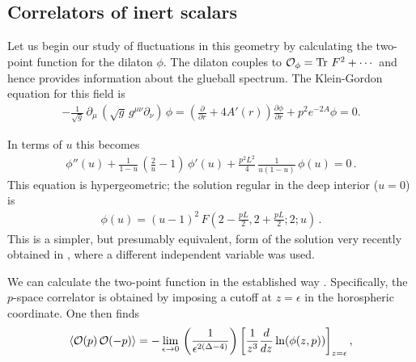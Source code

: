\documentclass[a4paper,12pt]{article}
\def\Tr{\rm Tr\ }
\begin{document}
\subsection{Correlators of inert scalars}

Let us begin our study of fluctuations in this geometry by calculating the
two-point function for the dilaton $\phi$.  The dilaton couples to
${\cal O}_\phi ={\Tr} F^2 + \cdots$ and hence provides information 
about the glueball
spectrum.  The Klein-Gordon equation for this field is 
\begin{eqnarray}
- \frac{1}{\sqrt{g}} \, \partial_{\mu} \, (\sqrt{g} \, g^{\mu \nu}
 \partial_{\nu} ) \, \phi = \left(\frac{\partial}{\partial r} +4A'(r)
 \right) \frac{ \partial \phi}{\partial r} +p^2 e^{-2A} \phi =0.
\end{eqnarray}

In terms of $u$ this becomes
\begin{eqnarray}
\phi''(u) + \frac{1}{1-u} \, \left( \frac{2}{u} -1 \right) \, \phi'(u)
+ \frac{p^2 L^2}{4} \, \frac{1}{u (1-u)} \, \phi(u) = 0 \,.
\end{eqnarray}
This equation is hypergeometric; the solution regular in the
deep interior ($u = 0$) is
\begin{eqnarray}
\phi(u) = (u-1)^2 \, F \left( 2- \frac{pL}{2},2+ \frac{pL}{2};2;u \right) \,.
\end{eqnarray}
This is a simpler, but presumably equivalent, form of the solution very 
recently
obtained in \cite{agpz}, where a different independent variable was used.

We can calculate the two-point function in the established way
\cite{gkp,fmmr}. Specifically, the $p$-space correlator is obtained by
imposing a cutoff at $z=\epsilon$ in the horospheric coordinate. One
then finds
\begin{eqnarray}
\label{2ptfunc}
\langle{\cal O}(p) \, {\cal O} (-p)\rangle = - \lim_{\epsilon \rightarrow 0} \, \left( \frac{1}{\epsilon^{2(\Delta-4)}} \right) \left[
\frac{1}{z^3} \frac{d}{dz} \ln(\phi(z,p)) \right]_{z= \epsilon},
\end{eqnarray}
\end{document}
